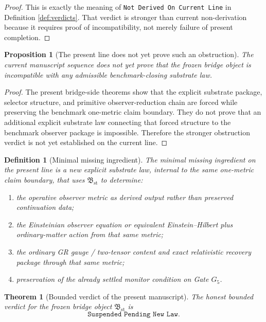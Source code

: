 \documentclass[11pt]{article}
\newcommand{\StableBridgeObject}{\mathfrak B_{\mathrm{st}}}
\newcommand{\GateFive}{G_{5}}
\newtheorem{definition}{Definition}
\newtheorem{proposition}{Proposition}
\newtheorem{theorem}{Theorem}
\begin{document}
\begin{proof}
This is exactly the meaning of \texttt{Not Derived On Current Line} in Definition \ref{def:verdicts}. That verdict is stronger than current non-derivation because it requires proof of incompatibility, not merely failure of present completion.
\end{proof}

\begin{proposition}[The present line does not yet prove such an obstruction]
\label{prop:no_obstruction}
The current manuscript sequence does not yet prove that the frozen bridge object is incompatible with any admissible benchmark-closing substrate law.
\end{proposition}

\begin{proof}
The present bridge-side theorems show that the explicit substrate package, selector structure, and primitive observer-reduction chain are forced while preserving the benchmark one-metric claim boundary. They do not prove that an additional explicit substrate law connecting that forced structure to the benchmark observer package is impossible. Therefore the stronger obstruction verdict is not yet established on the current line.
\end{proof}

\begin{definition}[Minimal missing ingredient]
\label{def:missing_ingredient}
The \emph{minimal missing ingredient} on the present line is a new explicit substrate law, internal to the same one-metric claim boundary, that uses \(\StableBridgeObject\) to determine:
\begin{enumerate}
    \item the operative observer metric as derived output rather than preserved continuation data;
    \item the Einsteinian observer equation or equivalent Einstein--Hilbert plus ordinary-matter action from that same metric;
    \item the ordinary GR gauge / two-tensor content and exact relativistic recovery package through that same metric;
    \item preservation of the already settled monitor condition on Gate \(\GateFive\).
\end{enumerate}
\end{definition}

\begin{theorem}[Bounded verdict of the present manuscript]
\label{thm:final_verdict}
The honest bounded verdict for the frozen bridge object \(\StableBridgeObject\) is
\[
\texttt{Suspended Pending New Law}.
\]
\end{theorem}
\end{document}
